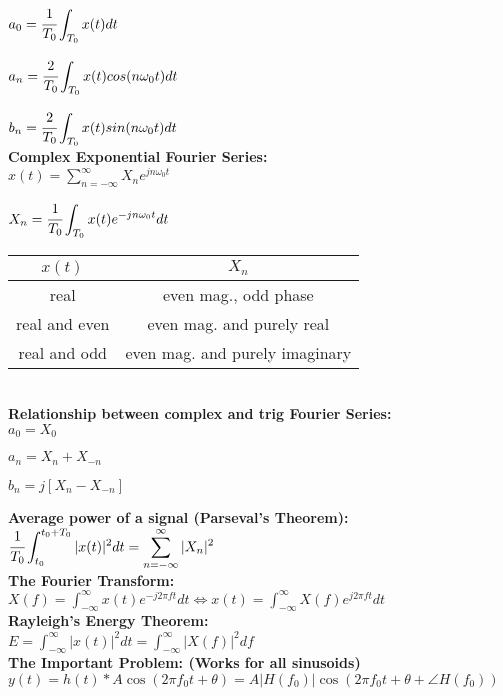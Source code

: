 \documentclass[10pt]{article}
\newcommand{\sect}[1]{\noindent\textbf{#1}\\}
\newcommand{\nin}{\noindent}
\begin{document}
\begin{ssmall}
\begin{multicols*}{2}
	\nin $a_0 = \cfrac{1}{T_0}\displaystyle\int_{T_0}{x(t)dt}$ 
	
	\nin $a_n = \cfrac{2}{T_0}\displaystyle\int_{T_0}{x(t)cos(n \omega_0 t) dt}$
	
	\nin $b_n = \cfrac{2}{T_0}\displaystyle\int_{T_0}{x(t)sin(n \omega_0 t) dt}$\\
	
	\sect{Complex Exponential Fourier Series:}
	
	\nin $x(t) = \sum\limits_{n=-\infty}^{\infty} X_n e^{j n \omega_0 t}$
	
	\nin $X_n = \cfrac{1}{T_0} \displaystyle\int_{T_0} x(t) e^{-j n \omega_0 t} dt$
	
	\nin \begin{tabular}{|c|c|}
		\hline
		$x(t)$ & $X_n$ \\ \hline
		real & even mag., odd phase \\
		real and even & even mag. and purely real \\
		real and odd & even mag. and purely imaginary \\ \hline
	\end{tabular}\\

	\sect{Relationship between complex and trig Fourier Series:}
	\nin $a_0 = X_0$
	
	\nin $a_n = X_n + X_{-n}$
	
	\nin $b_n = j[X_n - X_{-n}]$
	
	\sect{Average power of a signal (Parseval's Theorem):}
	\nin $\cfrac{1}{T_0}\displaystyle\int_{t_0}^{t_0+T_0} | x(t) |^2 dt = \sum\limits_{n=-\infty}^{\infty} | X_n | ^2$\\
	
	\sect{The Fourier Transform:}
	\nin $X(f) = \displaystyle \int_{-\infty}^{\infty} x(t) e^{-j 2 \pi f t} dt \Longleftrightarrow x(t) = \displaystyle\int_{-\infty}^{\infty} X(f) e^{j 2 \pi f t} dt$\\
	
	\sect{Rayleigh's Energy Theorem:}
	\nin $E = \displaystyle\int_{-\infty}^{\infty} |x(t)|^2 dt = \int_{-\infty}^{\infty} | X(f) |^2 df$\\
	
	\sect{The Important Problem: {\tiny(Works for all sinusoids)}}
	\nin $y(t) = h(t) \ast A\cos(2\pi f_0 t + \theta) = A|H(f_0)|\cos(2\pi f_0t + \theta + \angle H(f_0))$\\
	

\end{multicols*}
\end{ssmall}
\end{document}
